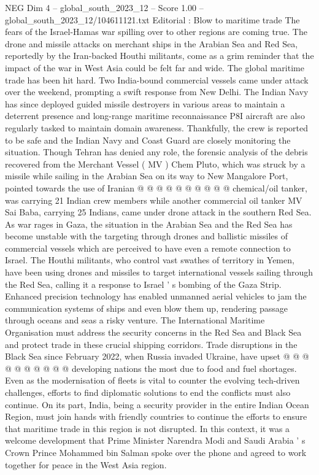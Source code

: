 \begin{textsample}{NEG Dim 4 – global\_south\_2023\_12 – Score 1.00 – global\_south\_2023\_12/104611121.txt}  \label{ex:f4_neg_326}
Editorial : Blow to maritime trade The fears of the Israel-Hamas war spilling over to other regions are coming true.
The drone and missile attacks on merchant ships in the Arabian Sea and Red Sea, reportedly by the Iran-backed Houthi militants, come as a grim reminder that the impact of the war in West Asia could be felt far and wide.
The global maritime trade has been hit hard.
Two India-bound commercial vessels came under attack over the weekend, prompting a swift response from New Delhi.
The Indian Navy has since deployed guided missile destroyers in various areas to maintain a deterrent presence and long-range maritime reconnaissance P8I aircraft are also regularly tasked to maintain domain awareness.
Thankfully, the crew is reported to be safe and the Indian Navy and Coast Guard are closely monitoring the situation.
Though Tehran has denied any role, the forensic analysis of the debris recovered from the Merchant Vessel ( MV ) Chem Pluto, which was struck by a missile while sailing in the Arabian Sea on its way to New Mangalore Port, pointed towards the use of Iranian @ @ @ @ @ @ @ @ @ @ chemical/oil tanker, was carrying 21 Indian crew members while another commercial oil tanker MV Sai Baba, carrying 25 Indians, came under drone attack in the southern Red Sea.
As war rages in Gaza, the situation in the Arabian Sea and the Red Sea has become unstable with the targeting through drones and ballistic missiles of commercial vessels which are perceived to have even a remote connection to Israel.
The Houthi militants, who control vast swathes of territory in Yemen, have been using drones and missiles to target international vessels sailing through the Red Sea, calling it a response to Israel ' s bombing of the Gaza Strip.
Enhanced precision technology has enabled unmanned aerial vehicles to jam the communication systems of ships and even blow them up, rendering passage through oceans and seas a risky venture.
The International Maritime Organisation must address the security concerns in the Red Sea and Black Sea and protect trade in these crucial shipping corridors.
Trade disruptions in the Black Sea since February 2022, when Russia invaded Ukraine, have upset @ @ @ @ @ @ @ @ @ @ developing nations the most due to food and fuel shortages.
Even as the modernisation of fleets is vital to counter the evolving tech-driven challenges, efforts to find diplomatic solutions to end the conflicts must also continue.
On its part, India, being a security provider in the entire Indian Ocean Region, must join hands with friendly countries to continue the efforts to ensure that maritime trade in this region is not disrupted.
In this context, it was a welcome development that Prime Minister Narendra Modi and Saudi Arabia ' s Crown Prince Mohammed bin Salman spoke over the phone and agreed to work together for peace in the West Asia region.

\end{textsample}
